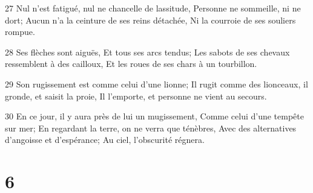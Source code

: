 \par 27 Nul n'est fatigué, nul ne chancelle de lassitude, Personne ne sommeille, ni ne dort; Aucun n'a la ceinture de ses reins détachée, Ni la courroie de ses souliers rompue.
\par 28 Ses flèches sont aiguës, Et tous ses arcs tendus; Les sabots de ses chevaux ressemblent à des cailloux, Et les roues de ses chars à un tourbillon.
\par 29 Son rugissement est comme celui d'une lionne; Il rugit comme des lionceaux, il gronde, et saisit la proie, Il l'emporte, et personne ne vient au secours.
\par 30 En ce jour, il y aura près de lui un mugissement, Comme celui d'une tempête sur mer; En regardant la terre, on ne verra que ténèbres, Avec des alternatives d'angoisse et d'espérance; Au ciel, l'obscurité régnera.

\chapter{6}

